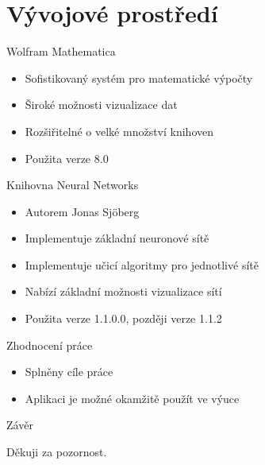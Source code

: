 \documentclass{beamer}
\begin{document}
\section{Vývojové prostředí}
\begin{frame}{Wolfram Mathematica}
\begin{itemize}
\item Sofistikovaný systém pro matematické výpočty
\item Široké možnosti vizualizace dat
\item Rozšiřitelné o velké množství knihoven 
\item Použita verze 8.0
\end{itemize}

\end{frame}

\begin{frame}{Knihovna Neural Networks}
\begin{itemize}
\item Autorem Jonas Sjöberg 
\item Implementuje základní neuronové sítě
\item Implementuje učicí algoritmy pro jednotlivé sítě
\item Nabízí základní možnosti vizualizace sítí
\item Použita verze 1.1.0.0, později verze 1.1.2
\end{itemize}
\end{frame}
\begin{frame}{Zhodnocení práce}
\begin{itemize}
\item Splněny cíle práce
\item Aplikaci je možné okamžitě použít ve výuce
\end{itemize}
\end{frame}


\begin{frame}{Závěr}
\begin{center}
\begin{huge}
Děkuji za pozornost.
\end{huge}
\end{center}

\end{frame}
\end{document}

